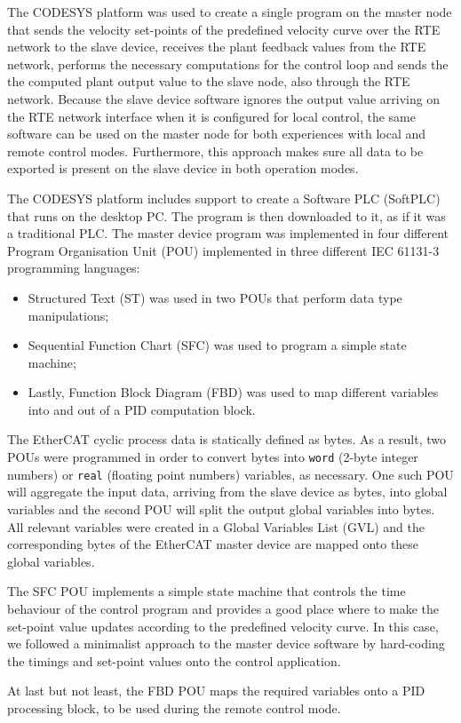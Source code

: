 The CODESYS platform was used to create a single program on the master node that sends the velocity set-points of the predefined velocity curve over the RTE network to the slave device, receives the plant feedback values from the RTE network, performs the necessary computations for the control loop and sends the the computed plant output value to the slave node, also through the RTE network.
Because the slave device software ignores the output value arriving on the RTE network interface when it is configured for local control, the same software can be used on the master node for both experiences with local and remote control modes.
Furthermore, this approach makes sure all data to be exported is present on the slave device in both operation modes.

The CODESYS platform includes support to create a Software PLC (SoftPLC) that runs on the desktop PC.
The program is then downloaded to it, as if it was a traditional PLC.
The master device program was implemented in four different Program Organisation Unit (POU) implemented in three different IEC 61131-3 programming languages: 
\begin{itemize}
	\item Structured Text (ST) was used in two POUs that perform data type manipulations;
	\item Sequential Function Chart (SFC) was used to program a simple state machine;
	\item Lastly, Function Block Diagram (FBD) was used to map different variables into and out of a PID computation block.
\end{itemize}

The EtherCAT cyclic process data is statically defined as bytes.
As a result, two POUs were programmed in order to convert bytes into \verb|word| (2-byte integer numbers) or \verb|real| (floating point numbers) variables, as necessary.
One such POU will aggregate the input data, arriving from the slave device as bytes, into global variables and the second POU will split the output global variables into bytes.
All relevant variables were created in a Global Variables List (GVL) and the corresponding bytes of the EtherCAT master device are mapped onto these global variables.

The SFC POU implements a simple state machine that controls the time behaviour of the control program and provides a good place where to make the set-point value updates according to the predefined velocity curve.
In this case, we followed a minimalist approach to the master device software by hard-coding the timings and set-point values onto the control application.

At last but not least, the FBD POU maps the required variables onto a PID processing block, to be used during the remote control mode.

